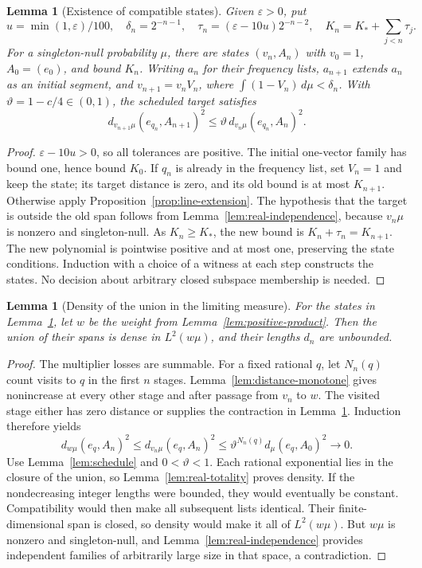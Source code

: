 \documentclass[reqno,a4paper,12pt]{amsart}
\newtheorem{lemma}[theorem]{Lemma}
\theoremstyle{definition}
\begin{document}
\begin{lemma}[Existence of compatible states]\label{lem:states}
Given $\varepsilon>0$, put
\[
 u=\min(1,\varepsilon)/100,\quad
 \delta_n=2^{-n-1},\quad
 \tau_n=(\varepsilon-10u)2^{-n-2},\quad
 K_n=K_*+\sum_{j<n}\tau_j.
\]
For a singleton-null probability $\mu$, there are states $(v_n,A_n)$
with $v_0=1$, $A_0=(e_0)$, and bound $K_n$.
Writing $a_n$ for their frequency lists, $a_{n+1}$ extends $a_n$
as an initial segment, and $v_{n+1}=v_nV_n$, where
$\int(1-V_n)\,d\mu<\delta_n$.
With $\vartheta=1-c/4\in(0,1)$, the scheduled target satisfies
\[
 d_{v_{n+1}\mu}(e_{q_n},A_{n+1})^2
 \le\vartheta\,d_{v_n\mu}(e_{q_n},A_n)^2.
\]
\end{lemma}
\begin{proof}
$\varepsilon-10u>0$, so all tolerances are positive.
The initial one-vector family has bound one, hence bound $K_0$.
If $q_n$ is already in the frequency list, set $V_n=1$ and keep the
state; its target distance is zero, and its old bound is at most
$K_{n+1}$. Otherwise apply Proposition~\ref{prop:line-extension}.
The hypothesis that the target is outside the old span follows from
Lemma~\ref{lem:real-independence}, because $v_n\mu$ is nonzero and
singleton-null. As $K_n\ge K_*$, the new bound is
$K_n+\tau_n=K_{n+1}$. The new polynomial is pointwise positive and
at most one, preserving the state conditions.
Induction with a choice of a witness at each step constructs the states.
No decision about arbitrary closed subspace membership is needed.
\end{proof}

\begin{lemma}[Density of the union in the limiting measure]
\label{lem:limit-density}
For the states in Lemma~\ref{lem:states}, let $w$ be the weight from
Lemma~\ref{lem:positive-product}. Then the union of their spans is
dense in $L^2(w\mu)$, and their lengths $d_n$ are unbounded.
\end{lemma}
\begin{proof}
The multiplier losses are summable. For a fixed rational $q$, let
$N_n(q)$ count visits to $q$ in the first $n$ stages.
Lemma~\ref{lem:distance-monotone} gives nonincrease at every other
stage and after passage from $v_n$ to $w$. The visited stage either
has zero distance or supplies the contraction in Lemma~\ref{lem:states}.
Induction therefore yields
\[
 d_{w\mu}(e_q,A_n)^2
 \le d_{v_n\mu}(e_q,A_n)^2
 \le\vartheta^{N_n(q)}d_\mu(e_q,A_0)^2\longrightarrow0.
\]
Use Lemma~\ref{lem:schedule} and $0<\vartheta<1$.
Each rational exponential lies in the closure of the union, so
Lemma~\ref{lem:real-totality} proves density.
If the nondecreasing integer lengths were bounded, they would
eventually be constant. Compatibility would then make all subsequent
lists identical. Their finite-dimensional span is closed, so density
would make it all of $L^2(w\mu)$.
But $w\mu$ is nonzero and singleton-null, and
Lemma~\ref{lem:real-independence} provides independent families of
arbitrarily large size in that space, a contradiction.
\end{proof}
\end{document}
